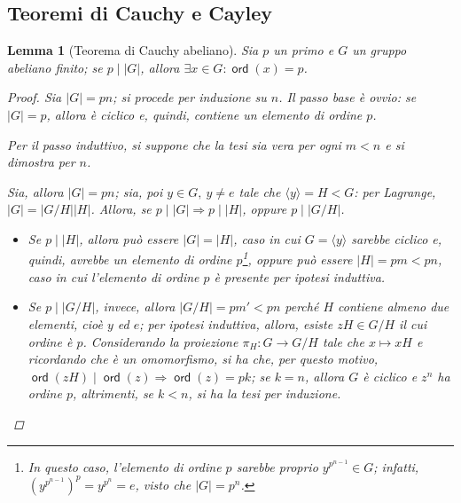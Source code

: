 \documentclass[11pt]{scrartcl}
\theoremstyle{style1}
\newtheorem{lemma}{Lemma}[teorema]
\numberwithin{equation}{subsection}
\renewcommand{\operatorname}[1]{\mathop{\mathrm{\textsf{#1}}}}
\begin{document}
\subsection{Teoremi di Cauchy e Cayley}
\begin{lemma}[Teorema di Cauchy abeliano]\label{cab}
	Sia $p$ un primo e $G$ un gruppo abeliano finito; se $p  \mid  |G|$, allora $\exists x \in G : \operatorname{ord}(x) =p$.
	\begin{proof}
		Sia $\lvert G \rvert = pn$; si procede per induzione su $n$.
		Il passo base \`e ovvio: se $\lvert G \rvert =p$, allora \`e ciclico e, quindi, contiene un elemento di ordine $p$.

		Per il passo induttivo, si suppone che la tesi sia vera per ogni $m < n$ e si dimostra per $n$.

		Sia, allora $\lvert G \rvert  = pn$; sia, poi $y \in G, \ y\neq e$ tale che $\langle y \rangle= H < G$: per Lagrange, $\lvert G \rvert  = \lvert G / H \rvert  \lvert H \rvert $.
		Allora, se $p  \mid \lvert G \rvert \Rightarrow  p  \mid \lvert H \rvert $, oppure $ p   \mid \lvert G / H \rvert $.
		\begin{itemize}
			\item Se $p  \mid \lvert H \rvert $, allora pu\`o essere $\lvert G \rvert  = \lvert H \rvert $, caso in cui $G = \langle y \rangle$ sarebbe ciclico e, quindi, avrebbe un elemento di ordine $p$\footnote{In questo caso, l'elemento di ordine $p$ sarebbe proprio $y^{p^{n-1} } \in G $; infatti, $(y^{p^{n-1} } )^p = y^{p^n} = e$, visto che $|G| = p^n$.}, oppure pu\`o essere $\lvert H \rvert  = pm < pn$, caso in cui l'elemento di ordine $p$ \`e presente per ipotesi induttiva.
			\item Se $p  \mid  \lvert G / H \rvert $, invece, allora $\lvert G / H \rvert = pm' < pn$ perch\'e $H$ contiene almeno due elementi, cio\`e $y$ ed $e$; per ipotesi induttiva, allora, esiste $zH \in G / H$ il cui ordine \`e $p$.
				Considerando la proiezione $\pi_H : G \to G / H$ tale che $x \mapsto xH$ e ricordando che \`e un omomorfismo, si ha che, per questo motivo, $\operatorname{ord}(zH)  \mid \operatorname{ord}(z)\Rightarrow \operatorname{ord}(z) = pk$; se $k = n$, allora $G$ \`e ciclico e $z^n$ ha ordine $p$, altrimenti, se $k<n$, si ha la tesi per induzione.
		\end{itemize}
	\end{proof}
\end{lemma}
\end{document}
